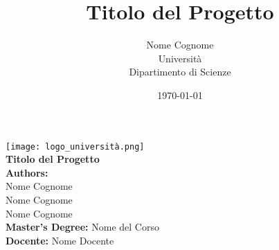 \documentclass[a4paper, 12pt]{article}
\title{\Huge \textbf{Titolo del Progetto}}
\author{\Large Nome Cognome \\[1ex]
        Università \\ Dipartimento di Scienze}
\date{\today}
\begin{document}
\begin{titlepage}
    \centering
    \vspace*{1cm}
    
    \texttt{[image: logo\_università.png]} \\[1.5cm]

    {\Huge \textbf{Titolo del Progetto}} \\[1cm]

    \Large
    \textbf{Authors:}\\ Nome Cognome \\
                        Nome Cognome \\
                        Nome Cognome \\
    
    \textbf{Master's Degree:} Nome del Corso \\
    \textbf{Docente:} Nome Docente \\[1cm]
    
    \vfill
    
\end{titlepage}

\tableofcontents

\end{document}
